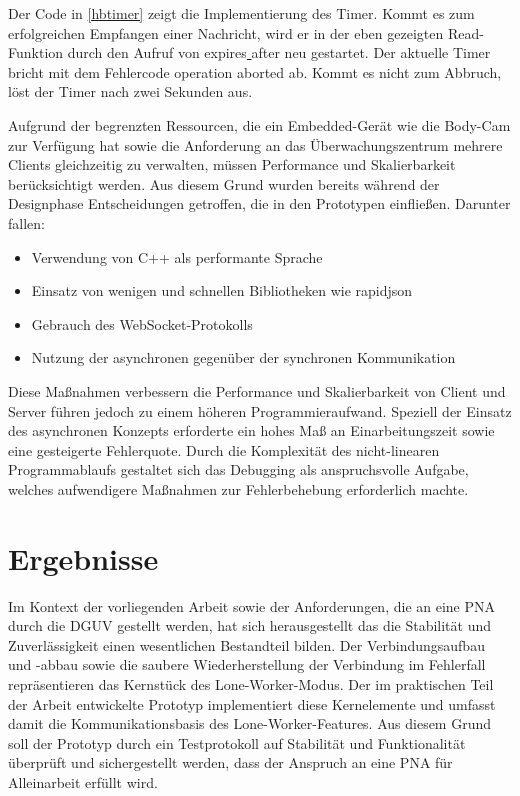 \documentclass[thesis.tex]{subfiles}
\begin{document}
Der Code in \autoref{hbtimer} zeigt die Implementierung des Timer.
Kommt es zum erfolgreichen Empfangen einer Nachricht, wird er in der eben gezeigten Read-Funktion durch den Aufruf von \glqq expires\underline{ }after\grqq{} neu gestartet.
Der aktuelle Timer bricht mit dem Fehlercode \glqq operation aborted\grqq{} ab.
Kommt es nicht zum Abbruch, löst der Timer nach zwei Sekunden aus.

Aufgrund der begrenzten Ressourcen, die ein Embedded-Gerät wie die Body-Cam zur Verfügung hat sowie die Anforderung an das Überwachungszentrum mehrere Clients gleichzeitig zu verwalten, müssen Performance und Skalierbarkeit berücksichtigt werden.
Aus diesem Grund wurden bereits während der Designphase Entscheidungen getroffen, die in den Prototypen einfließen.
Darunter fallen:
\begin{itemize}
    \item Verwendung von C++ als performante Sprache
    \item Einsatz von wenigen und schnellen Bibliotheken wie \glqq rapidjson\grqq{}
    \item Gebrauch des WebSocket-Protokolls
    \item Nutzung der asynchronen gegenüber der synchronen Kommunikation
\end{itemize}

Diese Maßnahmen verbessern die Performance und Skalierbarkeit von Client und Server führen jedoch zu einem höheren Programmieraufwand.
Speziell der Einsatz des asynchronen Konzepts erforderte ein hohes Maß an Einarbeitungszeit sowie eine gesteigerte Fehlerquote.
Durch die Komplexität des nicht-linearen Programmablaufs gestaltet sich das Debugging als anspruchsvolle Aufgabe, welches aufwendigere Maßnahmen zur Fehlerbehebung erforderlich machte.

\section{Ergebnisse}\label{chap:ergebnisse}

Im Kontext der vorliegenden Arbeit sowie der Anforderungen, die an eine PNA durch die DGUV gestellt werden, hat sich herausgestellt das die Stabilität und Zuverlässigkeit einen wesentlichen Bestandteil bilden.
Der Verbindungsaufbau und -abbau sowie die saubere Wiederherstellung der Verbindung im Fehlerfall repräsentieren das Kernstück des Lone-Worker-Modus.
Der im praktischen Teil der Arbeit entwickelte Prototyp implementiert diese Kernelemente und umfasst damit die Kommunikationsbasis des Lone-Worker-Features.
Aus diesem Grund soll der Prototyp durch ein Testprotokoll auf Stabilität und Funktionalität überprüft und sichergestellt werden, dass der Anspruch an eine PNA für Alleinarbeit erfüllt wird.
\end{document}
